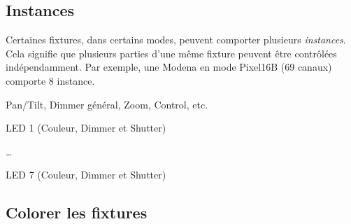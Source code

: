 \subsection{Instances}
\label{subsec:prep_instances}

Certaines fixtures, dans certains modes, peuvent comporter plusieurs \textit{instances}. Cela signifie que plusieurs parties d'une même fixture peuvent être contrôlées indépendamment.
\newline
Par exemple, une Modena en mode Pixel16B (69 canaux) comporte 8 instance.
\begin{list}{-}{}
    \item Pan/Tilt, Dimmer général, Zoom, Control, etc.
    \item LED 1 (Couleur, Dimmer et Shutter)
    \item \dots
    \item LED 7 (Couleur, Dimmer et Shutter)
\end{list}

\subsection{Colorer les fixtures}
\label{subsec:prep_colorer}

